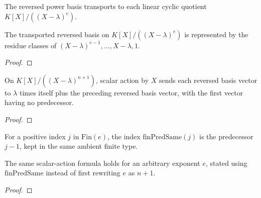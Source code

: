 \begin{definition}
  \label{def:linear_quotient_reverse_basis}
  \leanok
  The reversed power basis transports to each linear cyclic quotient
  \(K[X]/((X-\lambda)^e)\).
\end{definition}

\begin{theorem}
  \label{thm:linear_quotient_reverse_basis_apply}
  \leanok
  The transported reversed basis on \(K[X]/((X-\lambda)^e)\) is represented by
  the residue classes of \((X-\lambda)^{e-1},\ldots,X-\lambda,1\).
\end{theorem}

\begin{proof}
  \leanok
\end{proof}

\begin{theorem}
  \label{thm:linear_quotient_x_action}
  \leanok
  On \(K[X]/((X-\lambda)^{n+1})\), scalar action by \(X\) sends each reversed
  basis vector to \(\lambda\) times itself plus the preceding reversed basis
  vector, with the first vector having no predecessor.
\end{theorem}

\begin{proof}
  \leanok
\end{proof}

\begin{definition}
  \label{def:fin_pred_same}
  \leanok
  For a positive index \(j\) in \(\mathrm{Fin}(e)\), the index
  \(\mathrm{finPredSame}(j)\) is the predecessor \(j-1\), kept in the same
  ambient finite type.
\end{definition}

\begin{theorem}
  \label{thm:linear_quotient_x_action_general}
  \leanok
  The same scalar-action formula holds for an arbitrary exponent \(e\), stated
  using \(\mathrm{finPredSame}\) instead of first rewriting \(e\) as \(n+1\).
\end{theorem}

\begin{proof}
  \leanok
\end{proof}

